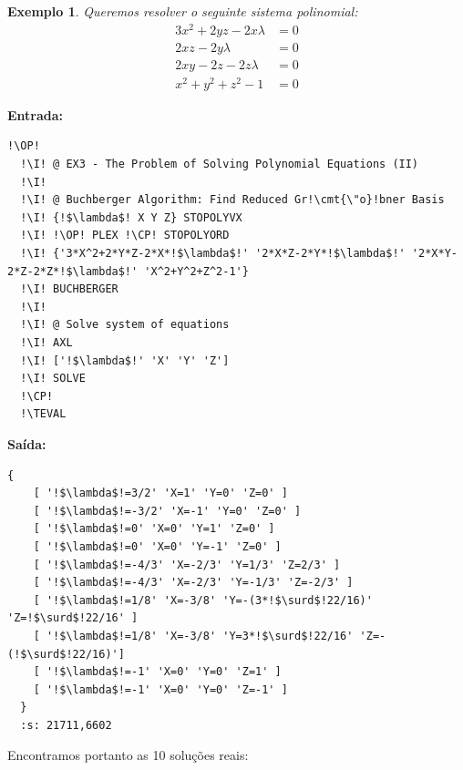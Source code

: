 \documentclass[12pt,a4paper]{report}
\newcommand{\kwd}[1]{\texttt{\textcolor{keyword}{#1}}}
\newcommand{\cmt}[1]{\texttt{\textcolor{comment}{#1}}}
\newcommand{\I}{\enspace\textcolor{indent}\vrule\hspace{2pt}}
\newcommand{\TEVAL}{\kwd{TEVAL}}   %
\newcommand{\OP}{\kwd{$\ll$}}   %
\newcommand{\CP}{\kwd{$\gg$}}   %
\newtheorem{example}[theorem]{Exemplo}
\numberwithin{theorem}{chapter}
\begin{document}
\begin{example}
  Queremos resolver o seguinte sistema polinomial:
  \begin{align*}
    3 x^2 + 2 y z - 2 x \lambda &= 0 \\
    2 x z - 2 y \lambda &= 0\\
    2 x y - 2 z - 2 z \lambda &= 0\\
    x^2 + y^2 + z^2 - 1 &= 0
  \end{align*}
\end{example}

\noindent\textbf{Entrada:}

\begin{lstlisting}[language=userrpl]
  !\OP!
  !\I! @ EX3 - The Problem of Solving Polynomial Equations (II)
  !\I!
  !\I! @ Buchberger Algorithm: Find Reduced Gr!\cmt{\"o}!bner Basis
  !\I! {!$\lambda$! X Y Z} STOPOLYVX
  !\I! !\OP! PLEX !\CP! STOPOLYORD
  !\I! {'3*X^2+2*Y*Z-2*X*!$\lambda$!' '2*X*Z-2*Y*!$\lambda$!' '2*X*Y-2*Z-2*Z*!$\lambda$!' 'X^2+Y^2+Z^2-1'}
  !\I! BUCHBERGER
  !\I!
  !\I! @ Solve system of equations
  !\I! AXL
  !\I! ['!$\lambda$!' 'X' 'Y' 'Z']
  !\I! SOLVE
  !\CP!
  !\TEVAL
\end{lstlisting}

\noindent\textbf{Saída:}

\begin{lstlisting}[language=userrpl]
  {
    [ '!$\lambda$!=3/2' 'X=1' 'Y=0' 'Z=0' ]
    [ '!$\lambda$!=-3/2' 'X=-1' 'Y=0' 'Z=0' ]
    [ '!$\lambda$!=0' 'X=0' 'Y=1' 'Z=0' ]
    [ '!$\lambda$!=0' 'X=0' 'Y=-1' 'Z=0' ]
    [ '!$\lambda$!=-4/3' 'X=-2/3' 'Y=1/3' 'Z=2/3' ]
    [ '!$\lambda$!=-4/3' 'X=-2/3' 'Y=-1/3' 'Z=-2/3' ]
    [ '!$\lambda$!=1/8' 'X=-3/8' 'Y=-(3*!$\surd$!22/16)' 'Z=!$\surd$!22/16' ]
    [ '!$\lambda$!=1/8' 'X=-3/8' 'Y=3*!$\surd$!22/16' 'Z=-(!$\surd$!22/16)']
    [ '!$\lambda$!=-1' 'X=0' 'Y=0' 'Z=1' ]
    [ '!$\lambda$!=-1' 'X=0' 'Y=0' 'Z=-1' ]
  }
  :s: 21711,6602
\end{lstlisting}

Encontramos portanto as 10 soluções reais:
\end{document}
